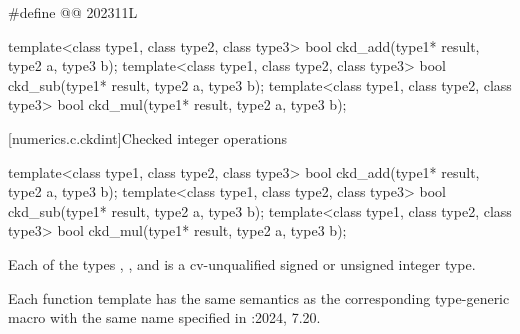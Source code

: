 %
\begin{codeblock}
#define @@ 202311L

template<class type1, class type2, class type3>
  bool ckd_add(type1* result, type2 a, type3 b);
template<class type1, class type2, class type3>
  bool ckd_sub(type1* result, type2 a, type3 b);
template<class type1, class type2, class type3>
  bool ckd_mul(type1* result, type2 a, type3 b);
\end{codeblock}

\pnum
{}   %

[numerics.c.ckdint]{Checked integer operations}

%
%
%
\begin{itemdecl}
template<class type1, class type2, class type3>
  bool ckd_add(type1* result, type2 a, type3 b);
template<class type1, class type2, class type3>
  bool ckd_sub(type1* result, type2 a, type3 b);
template<class type1, class type2, class type3>
  bool ckd_mul(type1* result, type2 a, type3 b);
\end{itemdecl}

\begin{itemdescr}
\pnum
\mandates
Each of the types , , and  is a
cv-unqualified signed or unsigned integer type.

\pnum
\remarks
Each function template has the same semantics as
the corresponding type-generic macro with the same name
specified in \IsoCUndated{}:2024, 7.20.
\end{itemdescr}
